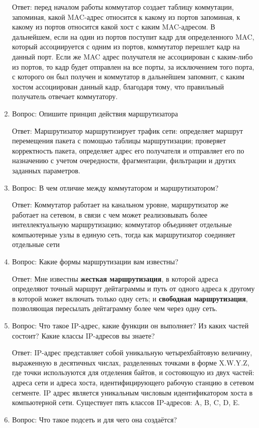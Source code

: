\documentclass[14pt]{extarticle}
\begin{document}
\begin{enumerate}
    Ответ: перед началом работы коммутатор создает таблицу коммутации, запоминая, какой MAC-адрес относится к какому из портов запоминая, к какому из портов относится какой хост с каким MAC-адресом. В дальнейшем, если на один из портов поступит кадр для определенного MAC, который ассоциируется с одним из портов, коммутатор перешлет кадр на данный порт. Если же MAC адрес получателя не ассоциирован с каким-либо из портов, то кадр будет отправлен на все порты, за исключением того порта, с которого он был получен и коммутатор в дальнейшем запомнит, с каким хостом ассоциирован данный кадр, благодаря тому, что правильный получатель отвечает коммутатору.
    \item Вопрос: Опишите принцип действия маршрутизатора

    Ответ: Маршрутизатор маршрутизирует трафик сети: определяет маршрут перемещения пакета с помощью таблицы маршрутизации; проверяет корректность пакета, определяет адрес его получателя и отправляет его по назначению с учетом очередности, фрагментации, фильтрации и других заданных параметров.
    \item Вопрос: В чем отличие между коммутатором и маршрутизатором?

    Ответ: Коммутатор работает на канальном уровне, маршрутизатор же работает на сетевом, в связи с чем может реализовывать более интеллектуальную маршрутизацию; коммутатор объединяет отдельные компьютерные узлы в единую сеть, тогда как маршрутизатор соединяет отдельные сети 
    \item Вопрос: Какие формы маршрутизации вам известны?

    Ответ: Мне известны \textbf{жесткая маршрутизация}, в которой адреса определяют точный маршрут дейтаграммы и путь от одного адреса к другому в которой может включать только одну сеть; и \textbf{свободная маршрутизация}, позволяющая пересылать дейтаграмму более чем через одну сеть.
    \item Вопрос: Что такое IP-адрес, какие функции он выполняет? Из каких частей состоит? Какие классы IP-адресов вы знаете?

    Ответ: IP-адрес представляет собой уникальную четырехбайтовую величину, выраженную в десятичных числах, разделенных точками в форме X.W.Y.Z, где точки используются для отделения байтов, и состояющую из двух частей: адреса сети и адреса хоста, идентифицирующего рабочую станцию в сетевом сегменте. IP адрес является уникальным числовым идентификатором хоста в компьютерной сети. Существует пять классов IP-адресов: A, B, C, D, E.
    \item Вопрос: Что такое подсеть и для чего она создаётся?


\end{enumerate}
\end{document}
